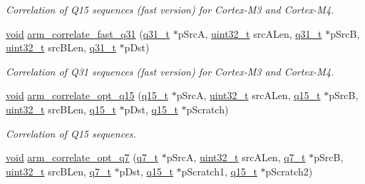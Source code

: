 \begin{DoxyCompactItemize}
\begin{DoxyCompactList}\small\item\em Correlation of Q15 sequences (fast version) for Cortex-\/\-M3 and Cortex-\/\-M4. \end{DoxyCompactList}\item 
\hyperlink{group___n_a_m_e_ga18028b8badbf1ea7e704ccac3c488e82}{void} \hyperlink{group___corr_gabecd3d7b077dbbef43f93e9e037815ed}{arm\-\_\-correlate\-\_\-fast\-\_\-q31} (\hyperlink{arm__math_8h_adc89a3547f5324b7b3b95adec3806bc0}{q31\-\_\-t} $\ast$p\-Src\-A, \hyperlink{stdint_8h_a435d1572bf3f880d55459d9805097f62}{uint32\-\_\-t} src\-A\-Len, \hyperlink{arm__math_8h_adc89a3547f5324b7b3b95adec3806bc0}{q31\-\_\-t} $\ast$p\-Src\-B, \hyperlink{stdint_8h_a435d1572bf3f880d55459d9805097f62}{uint32\-\_\-t} src\-B\-Len, \hyperlink{arm__math_8h_adc89a3547f5324b7b3b95adec3806bc0}{q31\-\_\-t} $\ast$p\-Dst)
\begin{DoxyCompactList}\small\item\em Correlation of Q31 sequences (fast version) for Cortex-\/\-M3 and Cortex-\/\-M4. \end{DoxyCompactList}\item 
\hyperlink{group___n_a_m_e_ga18028b8badbf1ea7e704ccac3c488e82}{void} \hyperlink{group___corr_gad71c0ec70ec69edbc48563d9a5f68451}{arm\-\_\-correlate\-\_\-opt\-\_\-q15} (\hyperlink{arm__math_8h_ab5a8fb21a5b3b983d5f54f31614052ea}{q15\-\_\-t} $\ast$p\-Src\-A, \hyperlink{stdint_8h_a435d1572bf3f880d55459d9805097f62}{uint32\-\_\-t} src\-A\-Len, \hyperlink{arm__math_8h_ab5a8fb21a5b3b983d5f54f31614052ea}{q15\-\_\-t} $\ast$p\-Src\-B, \hyperlink{stdint_8h_a435d1572bf3f880d55459d9805097f62}{uint32\-\_\-t} src\-B\-Len, \hyperlink{arm__math_8h_ab5a8fb21a5b3b983d5f54f31614052ea}{q15\-\_\-t} $\ast$p\-Dst, \hyperlink{arm__math_8h_ab5a8fb21a5b3b983d5f54f31614052ea}{q15\-\_\-t} $\ast$p\-Scratch)
\begin{DoxyCompactList}\small\item\em Correlation of Q15 sequences. \end{DoxyCompactList}\item 
\hyperlink{group___n_a_m_e_ga18028b8badbf1ea7e704ccac3c488e82}{void} \hyperlink{group___corr_ga746e8857cafe33ec5d6780729c18c311}{arm\-\_\-correlate\-\_\-opt\-\_\-q7} (\hyperlink{arm__math_8h_ae541b6f232c305361e9b416fc9eed263}{q7\-\_\-t} $\ast$p\-Src\-A, \hyperlink{stdint_8h_a435d1572bf3f880d55459d9805097f62}{uint32\-\_\-t} src\-A\-Len, \hyperlink{arm__math_8h_ae541b6f232c305361e9b416fc9eed263}{q7\-\_\-t} $\ast$p\-Src\-B, \hyperlink{stdint_8h_a435d1572bf3f880d55459d9805097f62}{uint32\-\_\-t} src\-B\-Len, \hyperlink{arm__math_8h_ae541b6f232c305361e9b416fc9eed263}{q7\-\_\-t} $\ast$p\-Dst, \hyperlink{arm__math_8h_ab5a8fb21a5b3b983d5f54f31614052ea}{q15\-\_\-t} $\ast$p\-Scratch1, \hyperlink{arm__math_8h_ab5a8fb21a5b3b983d5f54f31614052ea}{q15\-\_\-t} $\ast$p\-Scratch2)

\end{DoxyCompactItemize}
